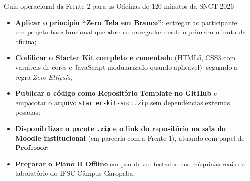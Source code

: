   {Guia operacional da Frente 2 para as Oficinas de 120 minutos da SNCT 2026}
  {\hspace{4pt}
   \hspace{4pt}
   }

\vspace{0.4em}

\begin{boxObjetivos}
\begin{itemize}
  \item \textbf{Aplicar o princípio ``Zero Tela em Branco''}: entregar ao participante um projeto base funcional que abre no navegador desde o primeiro minuto da oficina;
  \item \textbf{Codificar o Starter Kit completo e comentado} (HTML5, CSS3 com variáveis de cores e JavaScript modularizado quando aplicável), seguindo a regra \emph{Zero-Ellipsis};
  \item \textbf{Publicar o código como Repositório Template no GitHub} e empacotar o arquivo \texttt{starter-kit-snct.zip} sem dependências externas pesadas;
  \item \textbf{Disponibilizar o pacote \texttt{.zip} e o link do repositório na sala do Moodle institucional} (em parceria com a Frente 1), atuando com papel de \textbf{Professor};
  \item \textbf{Preparar o Plano B Offline} em pen-drives testados nas máquinas reais do laboratório do IFSC Câmpus Garopaba.
\end{itemize}
\end{boxObjetivos}

\begin{mapaAula}
\end{mapaAula}

